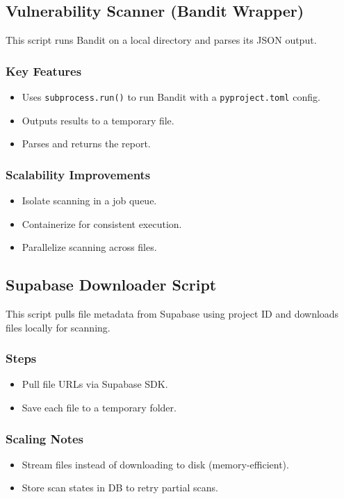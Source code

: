 \documentclass{article}
\begin{document}
\subsection{Vulnerability Scanner (Bandit Wrapper)}
This script runs Bandit on a local directory and parses its JSON output.

\subsubsection{Key Features}
\begin{itemize}
    \item Uses \texttt{subprocess.run()} to run Bandit with a \texttt{pyproject.toml} config.
    \item Outputs results to a temporary file.
    \item Parses and returns the report.
\end{itemize}

\subsubsection{Scalability Improvements}
\begin{itemize}
    \item Isolate scanning in a job queue.
    \item Containerize for consistent execution.
    \item Parallelize scanning across files.
\end{itemize}

\subsection{Supabase Downloader Script}
This script pulls file metadata from Supabase using project ID and downloads files locally for scanning.

\subsubsection{Steps}
\begin{itemize}
    \item Pull file URLs via Supabase SDK.
    \item Save each file to a temporary folder.
\end{itemize}

\subsubsection{Scaling Notes}
\begin{itemize}
    \item Stream files instead of downloading to disk (memory-efficient).
    \item Store scan states in DB to retry partial scans.
\end{itemize}
\end{document}
